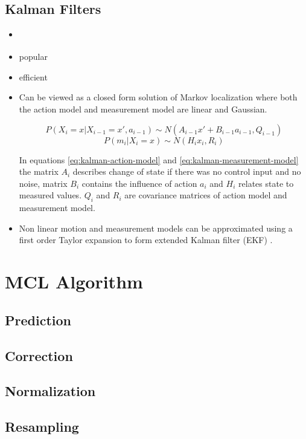 

\subsection{Kalman Filters}
\label{sec:kalman}

\begin{itemize}
\item \cite{kalman60,welch95}
\item popular
\item efficient
\item Can be viewed as a closed form solution of Markov localization where both the
	action model and measurement model are linear and Gaussian.

	\begin{equation}
	\label{eq:kalman-action-model}
	P(X_i = x | X_{i-1} = x', a_{i - 1}) \sim N(A_{i - 1}x' + B_{i - 1}a_{i - 1}, Q_{i - 1})
	\end{equation}
	\begin{equation}
	\label{eq:kalman-measurement-model}
	P(m_{i} | X_i = x) \sim N(H_{i}x_{i}, R_i)
	\end{equation}
	
	In equations \eqref{eq:kalman-action-model} and \eqref{eq:kalman-measurement-model}
	the matrix \(A_i\) describes change of state if there was no control input and no noise,
	matrix \(B_i\) contains the influence of action \(a_i\) and \(H_i\) relates state to measured
	values.
	\(Q_i\) and \(R_i\) are covariance matrices of action model and measurement model.

\item Non linear motion and measurement models can be approximated 
	using a first order Taylor expansion to form extended Kalman
	filter (EKF) \cite{welch95}.
\end{itemize}

\section{MCL Algorithm}
\label{sec:mcl-algorithm}

\cite{dellaert99}

\subsection{Prediction}
\subsection{Correction}
\subsection{Normalization}
\subsection{Resampling}
